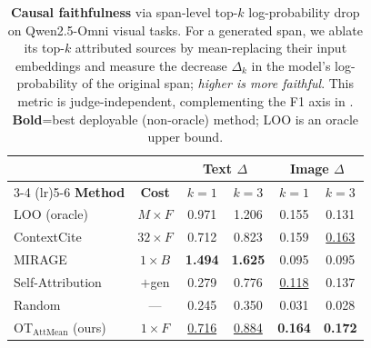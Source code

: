 \begin{table}[t]
\centering
\tablesize
\caption{
\textbf{Causal faithfulness} via span-level top-$k$ log-probability drop on Qwen2.5-Omni visual tasks.
For a generated span, we ablate its top-$k$ attributed sources by mean-replacing their input embeddings and measure the decrease $\Delta_k$ in the model's log-probability of the original span; \emph{higher is more faithful}.
This metric is judge-independent, complementing the F1 axis in .
\textbf{Bold}=best deployable (non-oracle) method; LOO is an oracle upper bound.
}
\label{tab:faithfulness}
\skiptablebegin
\begin{tabular}{lccccc}
\toprule
& & \multicolumn{2}{c}{Text $\Delta$} & \multicolumn{2}{c}{Image $\Delta$}\\
\cmidrule(lr){3-4} \cmidrule(lr){5-6}
\textbf{Method} & \textbf{Cost} & $k{=}1$ & $k{=}3$ & $k{=}1$ & $k{=}3$\\
\midrule
LOO \footnotesize(oracle)   & $M{\times}F$  & 0.971 & 1.206 & 0.155 & 0.131\\
ContextCite & $32{\times}F$ & 0.712 & 0.823 & 0.159 & \underline{0.163}\\
MIRAGE      & $1{\times}B$  & \textbf{1.494} & \textbf{1.625} & 0.095 & 0.095\\
Self-Attribution & $+$gen & 0.279 & 0.776 & \underline{0.118} & 0.137\\
Random           & ---    & 0.245 & 0.350 & 0.031 & 0.028\\
\midrule
OT$_\text{AttMean}$ (ours) & $1{\times}F$ & \underline{0.716} & \underline{0.884} & \textbf{0.164} & \textbf{0.172}\\
\bottomrule
\end{tabular}
\skiptableend
\end{table}